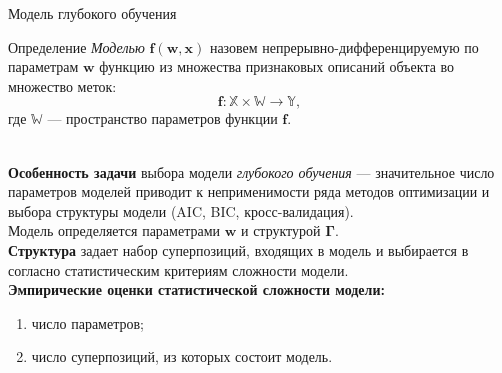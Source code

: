 \documentclass[usenames,dvipsnames,11pt,pdf,utf8,russian,aspectratio=43]{beamer}
\begin{document}
\begin{frame}{Модель глубокого обучения}
\small
\begin{block}{Определение}
\textit{Моделью} $\mathbf{f}(\mathbf{w}, \mathbf{x})$ назовем непрерывно-дифференцируемую по параметрам $\mathbf{w}$ функцию из множества признаковых описаний объекта во множество меток:
\[
    \mathbf{f}: \mathbb{X} \times \mathbb{W} \to \mathbb{Y},
\] 
где $\mathbb{W}$ --- пространство параметров функции $\mathbf{f}$.
\end{block}
~\\
\textbf{Особенность задачи}  выбора модели \textit{глубокого обучения} --- значительное число параметров моделей приводит к неприменимости ряда методов оптимизации и выбора структуры модели  (AIC, BIC, кросс-валидация). \\

Модель определяется параметрами $\mathbf{w}$ и структурой $\boldsymbol{\Gamma}$.\\
\textbf{Структура} задает набор суперпозиций, входящих в модель и выбирается в согласно статистическим критериям сложности модели.\\

\textbf{Эмпирические оценки статистической сложности модели:}
\begin{enumerate}
\item число параметров;
\item число суперпозиций, из которых состоит модель.
\end{enumerate}
\end{frame}
\end{document}
